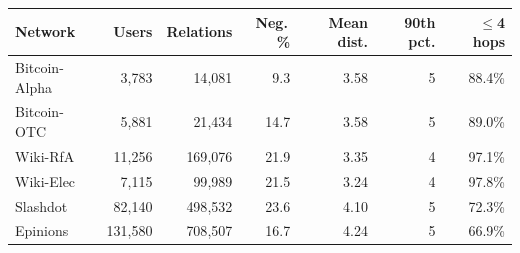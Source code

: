 \begin{tabular}{@{}lrrrrrr@{}}
\toprule
Network & Users & Relations & Neg.\,\% & Mean dist. & 90th pct. & $\le$4 hops \\
\midrule
Bitcoin-Alpha & 3{,}783 & 14{,}081 & 9.3 & 3.58 & 5 & 88.4\% \\
Bitcoin-OTC & 5{,}881 & 21{,}434 & 14.7 & 3.58 & 5 & 89.0\% \\
Wiki-RfA & 11{,}256 & 169{,}076 & 21.9 & 3.35 & 4 & 97.1\% \\
Wiki-Elec & 7{,}115 & 99{,}989 & 21.5 & 3.24 & 4 & 97.8\% \\
Slashdot & 82{,}140 & 498{,}532 & 23.6 & 4.10 & 5 & 72.3\% \\
Epinions & 131{,}580 & 708{,}507 & 16.7 & 4.24 & 5 & 66.9\% \\
\bottomrule
\end{tabular}
